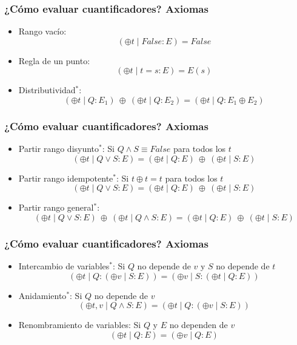 \documentclass{beamer}
\begin{document}
\begin{frame}[fragile]
    \frametitle{¿Cómo evaluar cuantificadores? Axiomas}
    \begin{itemize}
        \item Rango vacío: 
            $$(\oplus t \mid False: E) = False$$
        \item Regla de un punto:
            $$(\oplus t \mid t = s: E) = E(s)$$
        \item Distributividad$^{*}$:
            $$(\oplus t \mid Q: E_{1})\ \oplus\ (\oplus t \mid Q: E_{2}) = (\oplus t \mid Q: E_1 \oplus E_2)$$
    \end{itemize}
\end{frame}

\begin{frame}[fragile]
    \frametitle{¿Cómo evaluar cuantificadores? Axiomas}
    \begin{itemize}
        \item Partir rango disyunto$^{*}$: Si $Q \land S \equiv False$ para todos los $t$
            $$(\oplus t \mid Q \lor S : E) = (\oplus t \mid Q : E)\ \oplus\ (\oplus t \mid S : E)$$
        \item Partir rango idempotente$^{*}$: Si $t \oplus t = t$ para todos los $t$
            $$(\oplus t \mid Q \lor S : E) = (\oplus t \mid Q : E)\ \oplus\ (\oplus t \mid S : E)$$
        \item Partir rango general$^{*}$:
            $$(\oplus t \mid Q \lor S : E)\ \oplus\ (\oplus t \mid Q \land S : E) = (\oplus t \mid Q : E)\ \oplus\ (\oplus t \mid S : E)$$
    \end{itemize}
\end{frame}

\begin{frame}[fragile]
    \frametitle{¿Cómo evaluar cuantificadores? Axiomas}
    \begin{itemize}
        \item Intercambio de variables$^{*}$: Si $Q$ no depende de $v$ y $S$ no depende de $t$
            $$(\oplus t \mid Q : (\oplus v \mid S : E)) = (\oplus v \mid S : (\oplus t \mid Q : E))$$
        \item Anidamiento$^{*}$: Si $Q$ no depende de $v$
            $$(\oplus t,v \mid Q \land S : E) = (\oplus t \mid Q : (\oplus v \mid S : E))$$
        \item Renombramiento de variables: Si $Q$ y $E$ no dependen de $v$
            $$(\oplus t \mid Q : E) = (\oplus v \mid Q : E)$$
    \end{itemize}
\end{frame}
\end{document}
